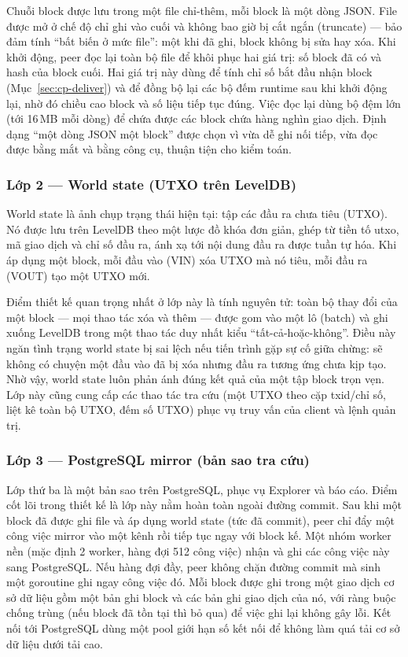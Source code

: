 Chuỗi block được lưu trong một file chỉ-thêm, mỗi block là một dòng JSON. File
được mở ở chế độ chỉ ghi vào cuối và không bao giờ bị cắt ngắn (truncate) ---
bảo đảm tính ``bất biến ở mức file'': một khi đã ghi, block không bị sửa hay
xóa. Khi khởi động, peer đọc lại toàn bộ file để khôi phục hai giá trị: số
block đã có và hash của block cuối. Hai giá trị này dùng để tính chỉ số bắt
đầu nhận block (Mục~\ref{sec:cp-deliver}) và để đồng bộ lại các bộ đếm runtime
sau khi khởi động lại, nhờ đó chiều cao block và số liệu tiếp tục đúng. Việc
đọc lại dùng bộ đệm lớn (tới 16\,MB mỗi dòng) để chứa được các block chứa
hàng nghìn giao dịch. Định dạng ``một dòng JSON một block'' được chọn vì vừa
dễ ghi nối tiếp, vừa đọc được bằng mắt và bằng công cụ, thuận tiện cho kiểm
toán.

\subsubsection{Lớp 2 --- World state (UTXO trên LevelDB)}

World state là ảnh chụp trạng thái hiện tại: tập các đầu ra chưa tiêu (UTXO).
Nó được lưu trên LevelDB theo một lược đồ khóa đơn giản, ghép từ tiền tố
utxo, mã giao dịch và chỉ số đầu ra, ánh xạ tới nội dung đầu ra được tuần tự
hóa. Khi áp dụng một block, mỗi đầu vào (VIN) xóa UTXO mà nó tiêu, mỗi đầu ra
(VOUT) tạo một UTXO mới.

Điểm thiết kế quan trọng nhất ở lớp này là tính nguyên tử: toàn bộ thay đổi
của một block --- mọi thao tác xóa và thêm --- được gom vào một lô (batch) và
ghi xuống LevelDB trong một thao tác duy nhất kiểu ``tất-cả-hoặc-không''.
Điều này ngăn tình trạng world state bị sai lệch nếu tiến trình gặp sự cố
giữa chừng: sẽ không có chuyện một đầu vào đã bị xóa nhưng đầu ra tương ứng
chưa kịp tạo. Nhờ vậy, world state luôn phản ánh đúng kết quả của một tập
block trọn vẹn. Lớp này cũng cung cấp các thao tác tra cứu (một UTXO theo
cặp txid/chỉ số, liệt kê toàn bộ UTXO, đếm số UTXO) phục vụ truy vấn của
client và lệnh quản trị.

\subsubsection{Lớp 3 --- PostgreSQL mirror (bản sao tra cứu)}

Lớp thứ ba là một bản sao trên PostgreSQL, phục vụ Explorer và báo cáo. Điểm
cốt lõi trong thiết kế là lớp này nằm hoàn toàn ngoài đường commit. Sau khi
một block đã được ghi file và áp dụng world state (tức đã commit), peer chỉ
đẩy một công việc mirror vào một kênh rồi tiếp tục ngay với block kế. Một
nhóm worker nền (mặc định 2 worker, hàng đợi 512 công việc) nhận và ghi các
công việc này sang PostgreSQL. Nếu hàng đợi đầy, peer không chặn đường commit
mà sinh một goroutine ghi ngay công việc đó. Mỗi block được ghi trong một
giao dịch cơ sở dữ liệu gồm một bản ghi block và các bản ghi giao dịch của
nó, với ràng buộc chống trùng (nếu block đã tồn tại thì bỏ qua) để việc ghi
lại không gây lỗi. Kết nối tới PostgreSQL dùng một pool giới hạn số kết nối
để không làm quá tải cơ sở dữ liệu dưới tải cao.

